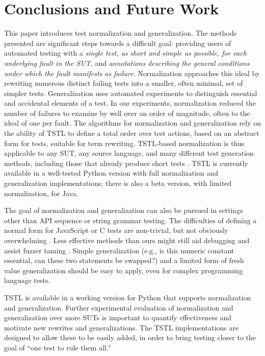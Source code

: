 \section{Conclusions and Future Work}

This paper introduces test normalization and generalization.  The
methods presented are significant steps towards a difficult goal: providing
users of automated testing with a \emph{single test, as short and
  simple as possible, for each underlying fault in the SUT}, and
\emph{annotations describing the general conditions under which the
  fault manifests as failure}.  Normalization approaches this ideal by
rewriting numerous distinct failing tests into a smaller, often
minimal, set of simpler tests.  Generalization uses
automated experiments to distinguish essential and accidental elements of
a test.   In our experiments, normalization reduced the
number of failures to examine by well over an order of magnitude, often  to the ideal of one per fault.  The algorithms for normalization and generalization rely
on the ability of TSTL \cite{NFM15,ISSTA15} to define a total order
over test actions, based on an abstract form for tests, suitable
for term rewriting.  TSTL-based normalization is thus applicable to
any SUT, any source language, and many different test generation methods,
including those that already produce short tests
\cite{FA11,SoftBET}.  TSTL is currently available in a well-tested Python
version with full normalization and generalization implementations;
there is also a
beta version, with limited normalization, for Java.


 The goal of normalization and generalization can also be pursued in
settings other than API sequence or string grammar testing.  The
difficulties of defining a normal form for JavaScript \cite{jsfunfuzz}
or C \cite{csmith} tests are non-trivial, but not obviously
overwhelming \cite{CReduce}. Less effective methods
than ours might still aid debugging and assist fuzzer taming
\cite{PLDI13}.  Simple generalization (e.g., is this numeric constant
essential, can these two statements be swapped?) and a limited form of
fresh value generalization should be easy to apply, even for complex
programming language tests.  

TSTL is available in a working version for Python \cite{tstl} that
supports normalization and generalization.  Further experimental
evaluation of normalization and generalization over more SUTs is
important to quantify effectiveness and motivate new rewrites and
generalizations.  The TSTL implementations are designed to allow these
to be easily added, in order to bring testing closer to the
goal of ``one test to rule them all.''
